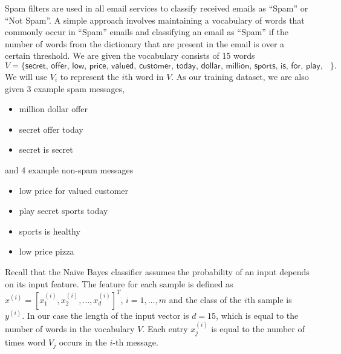 \documentclass[twoside,10pt]{article}
\begin{document}
\begin{enumerate}
Spam filters are used in all email services to classify received emails as ``Spam'' or ``Not Spam''. A simple approach involves maintaining a vocabulary of words that commonly occur in ``Spam'' emails and classifying an email as ``Spam'' if the number of words from the dictionary that are present in the email is over a certain threshold.
We are given the vocabulary consists of 15 words \[V=\{\textsf{secret, offer, low, price, valued, customer, today, dollar, million, sports, is, for, play, healthy, pizza}\}.\] We will use $V_i$ to represent the $i$th word in $V$. As our training dataset, we are also given 3 example spam messages,
\begin{itemize}
\item \textsf{million dollar offer}
\item \textsf{secret offer today}
\item \textsf{secret is secret}
\end{itemize}
and 4 example non-spam messages
\begin{itemize}
\item \textsf{low price for valued customer}
\item \textsf{play secret sports today}
\item \textsf{sports is healthy}
\item \textsf{low price pizza}
\end{itemize}

Recall that the Naive Bayes classifier assumes the probability of an input depends on its input feature. The feature for each sample is defined as
$x^{(i)} = [x_1^{(i)}, x_2^{(i)}, \ldots, x_d^{(i)}]^T$, $i = 1, \ldots, m$ and the class of the $i$th sample is $y^{(i)}$. In our case the length of the input vector is $d = 15$, which is equal to the number of words in the vocabulary $V$. Each entry $x_j^{(i)}$ is equal to the number of times word $V_j$ occurs in the $i$-th message. %


\end{enumerate}
\end{document}
